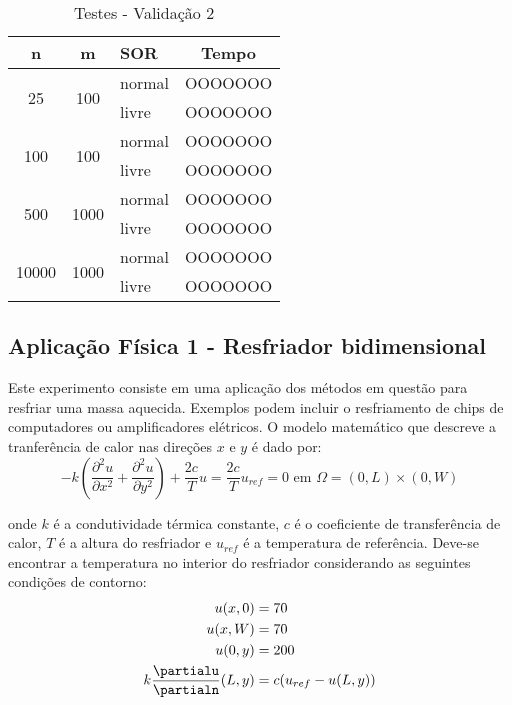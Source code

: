 \documentclass[
	11pt,				%
	oneside,			%
	a4paper,			%
	english,			%
	brazil,				%
	]{article}
\begin{document}
\begin{table}[ht]
\centering
\begin{tabular}{|c|c|l|c|}
\hline 
\textbf{n} & \textbf{m} & \textbf{SOR} & \textbf{Tempo} \\
\hline
\multirow{2}{*}{25}    & \multirow{2}{*}{100}  & normal & OOOOOOO \\
                       &                       & livre  & OOOOOOO \\
\hline
\multirow{2}{*}{100}   & \multirow{2}{*}{100}  & normal & OOOOOOO \\
                       &                       & livre  & OOOOOOO \\
\hline
\multirow{2}{*}{500}   & \multirow{2}{*}{1000} & normal & OOOOOOO \\
                       &                       & livre  & OOOOOOO \\
\hline
\multirow{2}{*}{10000} & \multirow{2}{*}{1000} & normal & OOOOOOO \\
                       &                       & livre  & OOOOOOO \\
\hline
\end{tabular}
\caption{Testes - Validação 2}
\label{tab:tv2}
\end{table}

\subsection{Aplicação Física 1 - Resfriador bidimensional}
Este experimento consiste em uma aplicação dos métodos em questão para
resfriar uma massa aquecida. Exemplos podem incluir o resfriamento de
chips de computadores ou amplificadores elétricos. O modelo matemático
que descreve a tranferência de calor nas direções $x$ e $y$ é dado por:
\begin{equation} \label{eq:a1}
- k\left(\frac{\partial^2 u}{\partial x^2} + \frac{\partial^2 u}{\partial 
y^2}\right) + \frac{2c}{T}u = \frac{2c}{T}u_{ref} = 0 \text{   em   }
\Omega = (0,L) \times (0, W)
\end{equation}

\noindent onde $k$ é a condutividade térmica constante, $c$ é o coeficiente de
transferência de calor, $T$ é a altura do resfriador e $u_{ref}$ é a
temperatura de referência. Deve-se encontrar a temperatura no interior
do resfriador considerando as seguintes condições de contorno:
\begin{align*}
u(x,0) &= 70\\
u(x,W) &= 70\\
u(0,y) &= 200\\
k\frac{\partialu}{\partialn}(L,y) &= c(u_{ref} - u(L,y))
\end{align*}
\end{document}
